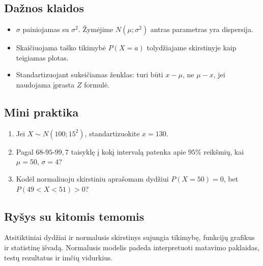 \subsection{Dažnos klaidos}
\begin{itemize}
\item \(\sigma\) painiojamas su \(\sigma^2\). Žymėjime \(N(\mu;\sigma^2)\) antras parametras yra dispersija.
\item Skaičiuojama taško tikimybė \(P(X=a)\) tolydžiajame skirstinyje kaip teigiamas plotas.
\item Standartizuojant sukeičiamas ženklas: turi būti \(x-\mu\), ne \(\mu-x\), jei naudojama įprasta \(Z\) formulė.
\end{itemize}

\subsection{Mini praktika}
\begin{enumerate}[label=\alph*)]
\item Jei \(X\sim N(100;15^2)\), standartizuokite \(x=130\).
\item Pagal \(68\)-\(95\)-\(99{,}7\) taisyklę į kokį intervalą patenka apie \(95\%\) reikšmių, kai \(\mu=50\), \(\sigma=4\)?
\item Kodėl normaliuoju skirstiniu aprašomam dydžiui \(P(X=50)=0\), bet \(P(49<X<51)>0\)?
\end{enumerate}

\subsection{Ryšys su kitomis temomis}
Atsitiktiniai dydžiai ir normalusis skirstinys sujungia tikimybę, funkcijų grafikus ir statistinę išvadą. Normalusis modelis padeda interpretuoti matavimo paklaidas, testų rezultatus ir imčių vidurkius.
